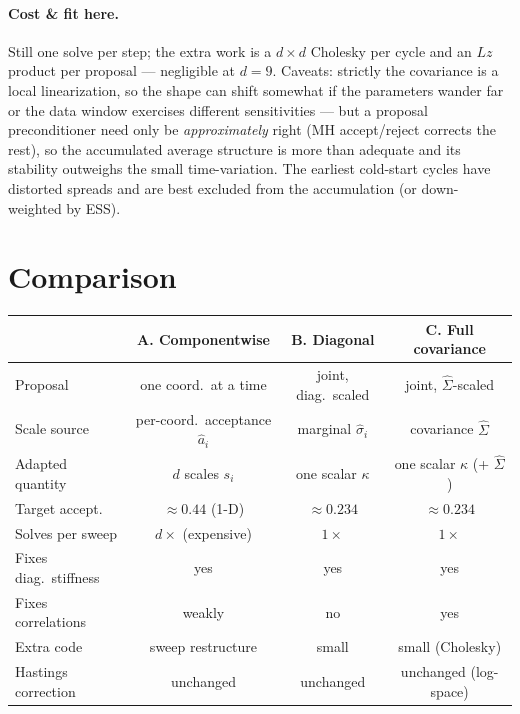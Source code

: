 \documentclass[11pt]{article}
\begin{document}
\paragraph{Cost \& fit here.} Still one solve per step; the extra work is a
$d\times d$ Cholesky per cycle and an $L z$ product per proposal ---
negligible at $d=9$. Caveats: strictly the covariance is a local
linearization, so the shape can shift somewhat if the parameters wander far
or the data window exercises different sensitivities --- but a proposal
preconditioner need only be \emph{approximately} right (MH accept/reject
corrects the rest), so the accumulated average structure is more than
adequate and its stability outweighs the small time-variation. The
earliest cold-start cycles have distorted spreads and are best excluded
from the accumulation (or down-weighted by ESS).

\section{Comparison}

\begin{center}
\begin{tabular}{@{}lccc@{}}
\toprule
 & \textbf{A. Componentwise} & \textbf{B. Diagonal} & \textbf{C. Full covariance}\\
\midrule
Proposal & one coord.\ at a time & joint, diag.\ scaled & joint, $\hat\Sigma$-scaled\\
Scale source & per-coord.\ acceptance $\hat a_i$ & marginal $\hat\sigma_i$ & covariance $\hat\Sigma$\\
Adapted quantity & $d$ scales $s_i$ & one scalar $\kappa$ & one scalar $\kappa$ (+ $\hat\Sigma$)\\
Target accept.\ & $\approx0.44$ (1-D) & $\approx0.234$ & $\approx0.234$\\
Solves per sweep & $d\times$ (expensive) & $1\times$ & $1\times$\\
Fixes diag.\ stiffness & yes & yes & yes\\
Fixes correlations & weakly & no & yes\\
Extra code & sweep restructure & small & small (Cholesky)\\
Hastings correction & unchanged & unchanged & unchanged (log-space)\\
\bottomrule
\end{tabular}
\end{center}
\end{document}
